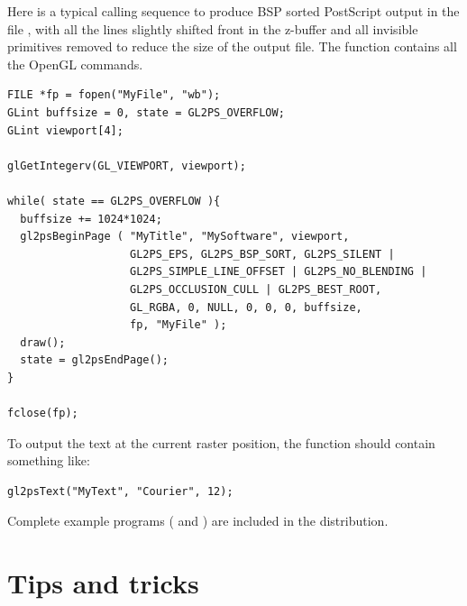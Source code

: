 Here is a typical calling sequence to produce BSP sorted PostScript output
in the file , with all the lines slightly shifted front in the
z-buffer and all invisible primitives removed to reduce the size of the
output file. The  function contains all the OpenGL commands.

\begin{verbatim}
FILE *fp = fopen("MyFile", "wb");
GLint buffsize = 0, state = GL2PS_OVERFLOW;
GLint viewport[4];

glGetIntegerv(GL_VIEWPORT, viewport);

while( state == GL2PS_OVERFLOW ){
  buffsize += 1024*1024;
  gl2psBeginPage ( "MyTitle", "MySoftware", viewport,
                   GL2PS_EPS, GL2PS_BSP_SORT, GL2PS_SILENT |
                   GL2PS_SIMPLE_LINE_OFFSET | GL2PS_NO_BLENDING |
                   GL2PS_OCCLUSION_CULL | GL2PS_BEST_ROOT,
                   GL_RGBA, 0, NULL, 0, 0, 0, buffsize,
                   fp, "MyFile" );
  draw();
  state = gl2psEndPage();
}

fclose(fp);
\end{verbatim}

\noindent To output the text  at the current raster position, the
 function should contain something like:

\begin{verbatim}
gl2psText("MyText", "Courier", 12);
\end{verbatim}

Complete example programs ( and )
are included in the distribution.


\section{Tips and tricks}
\label{sec:tips}

